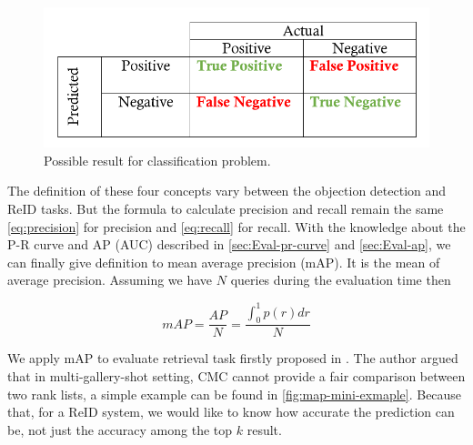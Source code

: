 \begin{figure}
    \centering
    \includegraphics[scale=0.4]{figures/eval_classif_metric.png}
    \caption{Possible result for classification problem.}
    \label{fig:eval-classif-metric}
\end{figure}

The definition of these four concepts vary between the objection detection
and ReID tasks. But the formula to calculate precision and recall remain the
same \autoref{eq:precision} for precision and \autoref{eq:recall} for recall.
With the knowledge about the P-R curve and AP (AUC) described in
\autoref{sec:Eval-pr-curve} and \autoref{sec:Eval-ap}, we can finally give
definition to mean average precision (mAP). It is the mean of average
precision. Assuming we have $N$ queries during the evaluation time then

\begin{equation}
\label{eq:map}
\mathit{mAP} = \frac{\mathit{AP}}{N} = \dfrac{\int_0^1p(r)dr}{N}
\end{equation}

We apply mAP to evaluate retrieval task firstly proposed in
\cite{dataset-market1501-2015}. The author argued that in multi-gallery-shot
setting, CMC cannot provide a fair comparison between two rank lists, a simple
example can be found in \autoref{fig:map-mini-exmaple}. Because that, for a ReID
system, we would like to know how accurate the prediction can be, not just the
accuracy among the top $k$ result.

